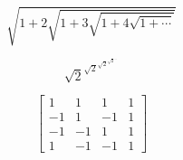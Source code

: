 \documentclass{article}
\begin{document}
  $$\sqrt{1 + 2\sqrt{1 + 3\sqrt{1 + 4\sqrt{1 + \cdots}}}}$$

  $$\sqrt{2}^{\sqrt{2}^{\sqrt{2}^{\sqrt{2}^{\cdots}}}}$$

  $$
  \begin{bmatrix}
		1 & 1 & 1 & 1 \\
		-1 & 1 & -1 & 1 \\
		-1 & -1 & 1 & 1 \\
		1 & -1 & -1 & 1
  \end{bmatrix}
  $$
\end{document}
